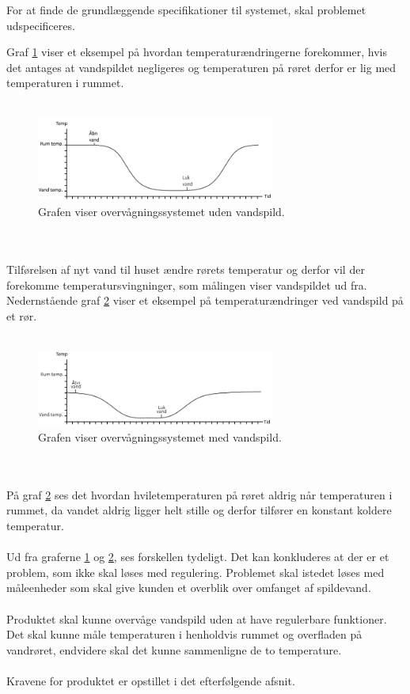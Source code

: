 For at finde de grundlæggende specifikationer til systemet, skal problemet udspecificeres.  

Graf \ref{vandspild_graf_normal} viser et eksempel på hvordan temperaturændringerne forekommer, hvis det antages at vandspildet negligeres og temperaturen på røret derfor er lig med temperaturen i rummet. 
\\
\\
\begin{figure}[h!]
  \centering
  \includegraphics[width=0.7\textwidth]{figures/vandspild_graf_normal.png}
  \caption{Grafen viser overvågningssystemet uden vandspild.}
  \label{vandspild_graf_normal}
\end{figure}
\\
\\
Tilførelsen af nyt vand til huset ændre rørets temperatur og derfor vil der forekomme temperatursvingninger, som målingen viser vandspildet ud fra. Nedernstående graf \ref{vandspild_graf_spild} viser et eksempel på temperaturændringer ved vandspild på et rør.
\\
\\
\begin{figure}[h!]
  \centering
  \includegraphics[width=0.7\textwidth]{figures/vandspild_graf_spild.png}
  \caption{Grafen viser overvågningssystemet med vandspild.}
  \label{vandspild_graf_spild}
\end{figure}
\\
\\
På graf \ref{vandspild_graf_spild} ses det hvordan hviletemperaturen på røret aldrig når temperaturen i rummet, da vandet aldrig ligger helt stille og derfor tilfører en konstant koldere temperatur.
\\
\\
Ud fra graferne \ref{vandspild_graf_normal} og \ref{vandspild_graf_spild}, ses forskellen tydeligt. Det kan konkluderes at der er et problem, som ikke skal løses med regulering. Problemet skal istedet løses med måleenheder som skal give kunden et overblik over omfanget af spildevand.
\\
\\
Produktet skal kunne overvåge vandspild uden at have regulerbare funktioner. Det skal kunne måle temperaturen i henholdvis rummet og overfladen på vandrøret, endvidere skal det kunne sammenligne de to temperature.
\\
\\
Kravene for produktet er opstillet i det efterfølgende afsnit.     